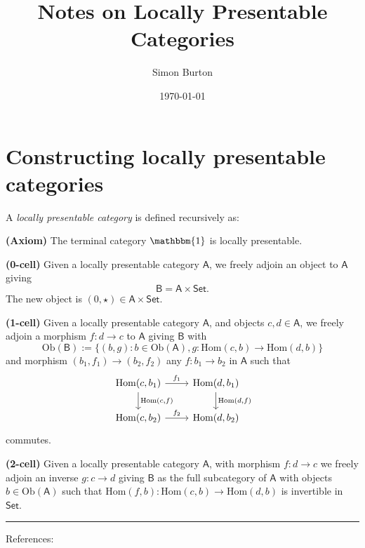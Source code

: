 \documentclass[11pt,oneside]{article}
\title{Notes on Locally Presentable Categories}
\author{Simon Burton}
\date{\today}
\newcommand{\Hom}{\mathrm{Hom}}
\newcommand\dodef[1]{\vskip 5pt \noindent{\bf \underline{Definition #1.}\ }}
\newcommand\tombstone{\rule{.36em}{2ex}\vskip 5pt}
\begin{document}
\maketitle





\section*{Constructing locally presentable categories}

\newcommand{\CatA}{\mathsf{A}}
\newcommand{\CatB}{\mathsf{B}}
\newcommand{\CatSet}{\mathsf{Set}}
\newcommand{\Ob}{\mathrm{Ob}}
\newcommand{\Mor}{\mathrm{Mor}}

\dodef{1}
A {\it locally presentable category} is defined recursively as:

{\bf (Axiom)} The terminal category $\mathbbm{1}$ is locally presentable.

{\bf (0-cell)} 
Given a locally presentable category $\mathsf{A}$,
we freely adjoin an object to $\mathsf{A}$ giving
$$
    \mathsf{B} = \mathsf{A}\times\mathsf{Set}.
$$
The new object is $(0,\star)\in \mathsf{A}\times\mathsf{Set}.$

{\bf (1-cell)} 
Given a locally presentable category $\mathsf{A}$,
and objects $c,d\in \mathsf{A}$,
we freely adjoin a morphism $f:d\to c$ to $\mathsf{A}$ giving
$\mathsf{B}$ with
$$
    \Ob(\CatB) := \{ (b,g) : b\in\Ob(\CatA), g:\Hom(c,b)\to\Hom(d,b) \}
$$
and morphism $(b_1,f_1)\to(b_2, f_2)$ any $f:b_1\to b_2$ in $\CatA$ such that
$$
\begin{tikzcd}
 \Hom(c,b_1) \arrow{d}{\Hom(c,f)} \arrow{r}{f_1} &  \Hom(d,b_1) \arrow{d}{\Hom(d,f)} \\
 \Hom(c,b_2) \arrow{r}{f_2} &  \Hom(d,b_2) 
\end{tikzcd}
$$
commutes.

{\bf (2-cell)}
Given a locally presentable category $\mathsf{A}$,
with morphism $f:d\to c$ we freely adjoin an inverse $g:c\to d$
giving $\CatB$ as the full subcategory of $\CatA$
with objects 
$ b\in\Ob(\CatA) $ such that  $\Hom(f,b):\Hom(c,b)\to\Hom(d,b)$
        is invertible in $\CatSet$.


\tombstone


References: \cite{Adamek1994} \cite{Riehl2017} \cite{Heunen2019}

{}

\end{document}
